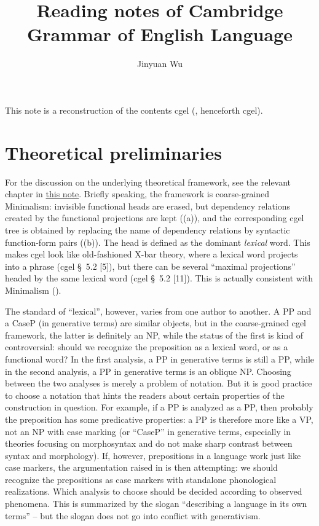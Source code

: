 \documentclass{article}
\title{Reading notes of Cambridge Grammar of English Language}
\author{Jinyuan Wu}
\newcommand*{\citesec}[1]{\S~{#1}}
\begin{document}
\maketitle

\automath

This note is a reconstruction of the contents \acl{cgel} (\citealt{cgel}, henceforth \acs{cgel}). 

\section{Theoretical preliminaries}

For the discussion on the underlying theoretical framework, 
see the relevant chapter in \href{../Chinese/main.pdf}{this note}.
Briefly speaking, the framework is coarse-grained Minimalism:
invisible functional heads are erased,
but dependency relations created by the functional projections are kept ((a)),
and the corresponding \ac{cgel} tree is obtained by replacing the name of dependency relations 
by syntactic function-form pairs ((b)).
The head is defined as the dominant \emph{lexical} word.
This makes \ac{cgel} look like old-fashioned X-bar theory, 
where a lexical word projects into a phrase (\ac{cgel} \citesec{5.2} [5]),
but there can be several ``maximal projections'' headed by the same lexical word (\ac{cgel} \citesec{5.2 [11]}).
This is actually consistent with Minimalism ().

The standard of ``lexical'', however, varies from one author to another.
A PP and a CaseP (in generative terms) are similar objects,
but in the coarse-grained \ac{cgel} framework,
the latter is definitely an NP, 
while the status of the first is kind of controversial:
should we recognize the preposition as a lexical word,
or as a functional word?
In the first analysis, a PP in generative terms is still a PP,
while in the second analysis, a PP in generative terms is an oblique NP.
Choosing between the two analyses is merely a problem of notation.
But it is good practice to choose a notation that hints the readers about 
certain properties of the construction in question.
For example, if a PP is analyzed as a PP, then probably the preposition has some predicative properties:
a PP is therefore more like a VP, not an NP with case marking 
(or ``CaseP'' in generative terms, especially in theories focusing on morphosyntax 
and do not make sharp contrast between syntax and morphology).
If, however, prepositions in a language work just like case markers,
the argumentation raised in \citet[\citesec{1.11}, \citesec{5.4}]{dixon2009basic1} is then attempting:
we should recognize the prepositions as case markers with standalone phonological realizations.
Which analysis to choose should be decided according to observed phenomena.
This is summarized by the slogan ``describing a language in its own terms''
-- but the slogan does not go into conflict with generativism.
\end{document}
